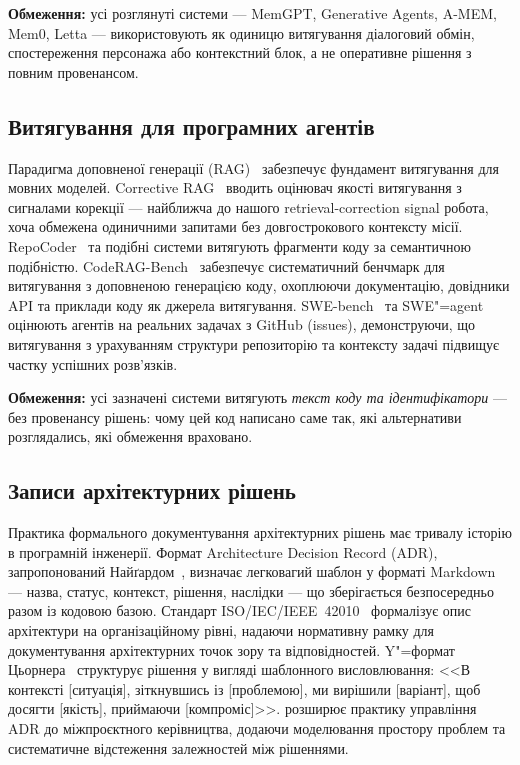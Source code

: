 \documentclass[11pt]{article}
\begin{document}
\textbf{Обмеження:} усі розглянуті системи --- MemGPT, Generative Agents, A-MEM, Mem0, Letta ---
використовують як одиницю витягування діалоговий обмін, спостереження персонажа
або контекстний блок, а не оперативне рішення з повним провенансом.

\subsection{Витягування для програмних агентів}

Парадигма доповненої генерації (RAG)~\citep{lewis2020rag} забезпечує фундамент витягування для мовних моделей.
Corrective RAG~\citep{yan2024crag} вводить оцінювач якості витягування з сигналами корекції --- найближча до нашого retrieval-correction signal робота, хоча обмежена одиничними запитами без довгострокового контексту місії.
RepoCoder~\citep{zhang2023repocoder} та подібні системи витягують фрагменти коду за семантичною подібністю.
CodeRAG-Bench~\citep{wang2024coderagbench} забезпечує систематичний бенчмарк для витягування з доповненою генерацією коду, охоплюючи документацію, довідники API та приклади коду як джерела витягування.
SWE-bench~\citep{jimenez2024swebench} та SWE"=agent~\citep{yang2024sweagent} оцінюють агентів на реальних задачах з GitHub (issues), демонструючи, що витягування з урахуванням структури репозиторію та контексту задачі підвищує частку успішних розв'язків.

\textbf{Обмеження:} усі зазначені системи витягують \emph{текст коду та ідентифікатори} --- без провенансу рішень: чому цей код написано саме так, які альтернативи розглядались, які обмеження враховано.

\subsection{Записи архітектурних рішень}
\label{sec:related-adr}

Практика формального документування архітектурних рішень має тривалу історію в програмній інженерії.
Формат Architecture Decision Record (ADR), запропонований Найґардом~\citep{nygard2011adr}, визначає легковагий шаблон у форматі Markdown --- назва, статус, контекст, рішення, наслідки --- що зберігається безпосередньо разом із кодовою базою.
Стандарт ISO/IEC/IEEE~42010~\citep{iso42010} формалізує опис архітектури на організаційному рівні, надаючи нормативну рамку для документування архітектурних точок зору та відповідностей.
Y"=формат Цьорнера~\citep{zorner2015softwarearchitekturen} структурує рішення у вигляді шаблонного висловлювання: <<В контексті [ситуація], зіткнувшись із [проблемою], ми вирішили [варіант], щоб досягти [якість], приймаючи [компроміс]>>.
\citet{zimmermann2015architectural} розширює практику управління ADR до міжпроєктного керівництва, додаючи моделювання простору проблем та систематичне відстеження залежностей між рішеннями.
\end{document}
